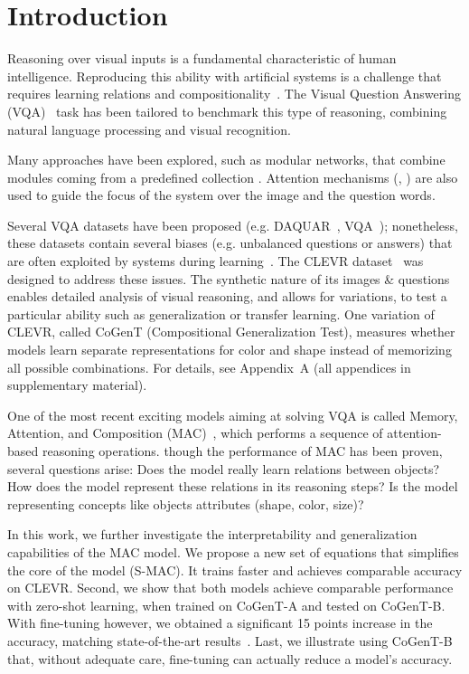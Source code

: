 \section{Introduction}
Reasoning over visual inputs is a fundamental characteristic of human intelligence.
Reproducing this ability with artificial systems is a challenge that requires learning relations and compositionality~\cite{hu2017learning, johnson2017inferring}. The Visual Question Answering (VQA)~\cite{antol2015vqa,malinowski2014towards,wu2017visual} task has been tailored to benchmark this type of reasoning, combining natural language processing and visual recognition.

Many approaches have been explored, such as modular networks, that combine modules coming from a predefined collection \cite{andreas2016learning,johnson2017inferring, mascharka2018transparency}. Attention mechanisms (\cite{bahdanau2014neural}, \cite{xu2015show}) are also used to guide the focus of the system over the image and the question words.

Several VQA datasets have been proposed (e.g. DAQUAR~\cite{malinowski2014multi}, VQA~\cite{antol2015vqa}); nonetheless, these datasets contain several biases (e.g. unbalanced questions or answers) that are often exploited by systems during learning~\cite{goyal2017making}.
The CLEVR dataset~\cite{johnson2017clevr} was designed to address these issues. The synthetic nature of its images \& questions enables detailed analysis of visual reasoning, and allows for variations, to test a particular ability such as generalization or transfer learning. One variation of CLEVR, called CoGenT (Compositional Generalization Test), measures whether models learn separate representations for color and shape instead of memorizing all possible combinations. 
For details, see Appendix~A (all appendices in supplementary material).


One of the most recent exciting models aiming at solving VQA is called Memory, Attention, and Composition (MAC)~\cite{hudson2018compositional}, which performs a sequence of attention-based reasoning operations. 
though the performance of MAC has been proven, several questions arise:
Does the model really learn relations between objects? 
How does the model represent these relations in its reasoning steps? 
Is the model representing concepts like objects attributes (shape, color, size)?

In this work, we further investigate the interpretability and generalization capabilities of the MAC model.
We propose a new set of equations that simplifies the core of the model (S-MAC). It trains faster and achieves comparable accuracy on CLEVR. 
Second, we show that both models achieve comparable performance with zero-shot learning, when trained on CoGenT-A and tested on CoGenT-B. With fine-tuning however, we obtained a significant 15 points increase in the accuracy, matching state-of-the-art results~\cite{perez2017film, mascharka2018transparency}.
Last, we illustrate using CoGenT-B that, without adequate care, fine-tuning can actually reduce a model's accuracy.

